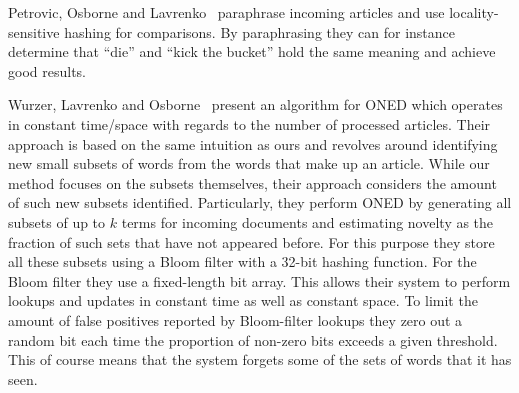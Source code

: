 Petrovic, Osborne and Lavrenko~\cite{petrovic2012using} paraphrase incoming articles and use locality-sensitive hashing for comparisons. By paraphrasing they can for instance determine that ``die'' and ``kick the bucket'' hold the same meaning and achieve good results.

Wurzer, Lavrenko and Osborne~\cite{wurzer2015kterm} present an algorithm for ONED which operates in constant time/space with regards to the number of processed articles. Their approach is based on the same intuition as ours and revolves around identifying new small subsets of words from the words that make up an article. While our method focuses on the subsets themselves, their approach considers the amount of such new subsets identified. Particularly, they perform ONED by generating all subsets of up to $k$ terms for incoming documents and estimating novelty as the fraction of such sets that have not appeared before. 
For this purpose they store all these subsets using a Bloom filter with a 32-bit hashing function. For the Bloom filter they use a fixed-length bit array. This allows their system to perform lookups and updates in constant time as well as constant space. To limit the amount of false positives reported by Bloom-filter lookups they zero out a random bit each time the proportion of non-zero bits exceeds a given threshold. This of course means that the system forgets some of the sets of words that it has seen.
